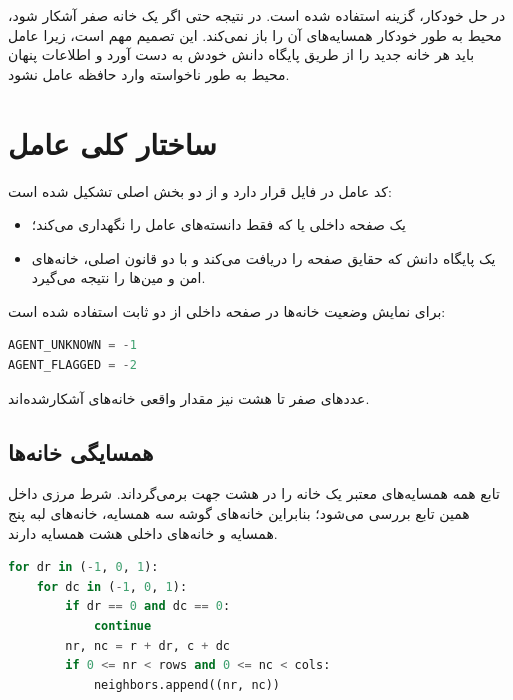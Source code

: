 \documentclass[10.5pt]{exam}
\begin{document}
در حل خودکار، گزینه
استفاده شده است. در نتیجه حتی اگر یک خانه صفر آشکار شود، محیط به طور خودکار همسایه‌های آن را باز نمی‌کند. این تصمیم مهم است، زیرا عامل باید هر خانه جدید را از طریق پایگاه دانش خودش به دست آورد و اطلاعات پنهان محیط به طور ناخواسته وارد حافظه عامل نشود.

\section{ساختار کلی عامل}
کد عامل در فایل
قرار دارد و از دو بخش اصلی تشکیل شده است:

\begin{itemize}
    \item یک صفحه داخلی یا
          که فقط دانسته‌های عامل را نگهداری می‌کند؛
    \item یک پایگاه دانش
          که حقایق صفحه را دریافت می‌کند و با دو قانون اصلی، خانه‌های امن و مین‌ها را نتیجه می‌گیرد.
\end{itemize}

برای نمایش وضعیت خانه‌ها در صفحه داخلی از دو ثابت استفاده شده است:

\begin{latin}
    \begin{lstlisting}[language=Python]
AGENT_UNKNOWN = -1
AGENT_FLAGGED = -2
\end{lstlisting}
\end{latin}

عددهای صفر تا هشت نیز مقدار واقعی خانه‌های آشکارشده‌اند.

\subsection{همسایگی خانه‌ها}
تابع
همه همسایه‌های معتبر یک خانه را در هشت جهت برمی‌گرداند. شرط مرزی داخل همین تابع بررسی می‌شود؛ بنابراین خانه‌های گوشه سه همسایه، خانه‌های لبه پنج همسایه و خانه‌های داخلی هشت همسایه دارند.

\begin{latin}
    \begin{lstlisting}[language=Python]
for dr in (-1, 0, 1):
    for dc in (-1, 0, 1):
        if dr == 0 and dc == 0:
            continue
        nr, nc = r + dr, c + dc
        if 0 <= nr < rows and 0 <= nc < cols:
            neighbors.append((nr, nc))
\end{lstlisting}
\end{latin}
\end{document}
